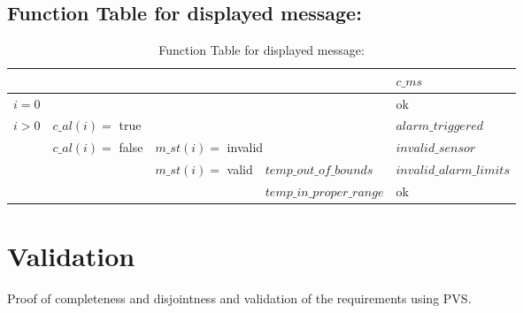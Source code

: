 \documentclass[fontsize=12pt,paper=letter,twoside]{scrartcl}
\begin{document}
\FloatBarrier
\subsection{Function Table for displayed message: }
\FloatBarrier

\begin{table}[htb!]
\centering
\label{my-label}
\begin{tabular}{llll|l|}
\cline{5-5}
                                                        &                                                        &                                                        &                                              & $c\_ms$                  \\ \hline
\multicolumn{4}{|l|}{$i = 0$}                                                                                                                                                                                              & ok                     \\ \hline
\multicolumn{1}{|l|}{\multirow{4}{*}{$i > 0$}} & \multicolumn{3}{l|}{$c\_al(i) =$ true}                                                                                                                           & $alarm\_triggered$       \\ \cline{2-5}
\multicolumn{1}{|l|}{}                                  & \multicolumn{1}{l|}{\multirow{3}{*}{$c\_al(i) =$ false}} & \multicolumn{2}{l|}{$m\_st(i) =$ invalid}                                                               & $invalid\_sensor$        \\ \cline{3-5}
\multicolumn{1}{|l|}{}                                  & \multicolumn{1}{l|}{}                                  & \multicolumn{1}{l|}{\multirow{2}{*}{$m\_st(i) =$ valid}} & $temp\_out\_of\_bounds$  \footnotemark & $invalid\_alarm\_limits$ \\ \cline{4-5}
\multicolumn{1}{|l|}{}                                  & \multicolumn{1}{l|}{}                                  & \multicolumn{1}{l|}{}                                  & $temp\_in\_proper\_range$ \footnotemark   & ok                     \\ \hline
\end{tabular}
\caption{Function Table for displayed message: }
\end{table}

\section{Validation}
Proof of completeness and disjointness and validation of the requirements using PVS.
\end{document}
